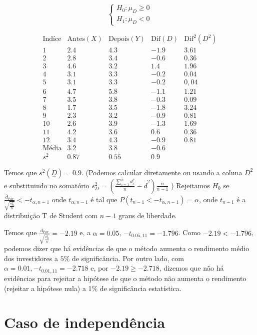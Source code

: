 \documentclass[
  letterpaper,
  DIV=11,
  numbers=noendperiod]{scrreprt}
\begin{document}
\[
\begin{cases}
H_{0}:\mu_{D} \geq 0 \\
H_{1}: \mu_{D} < 0
\end{cases}
\]

\[
\begin{array}{c|c|c|c}
\mathrm{Indíce}  & \mathrm{Antes}(X)  &  \mathrm{Depois}(Y) & \mathrm{Dif}(D) & \mathrm{Dif^2}(D^2)\\
\hline
1 & 2.4 &  4.3 & -1.9 & 3.61\\
2 & 2.8  & 3.4  & -0.6 & 0.36\\
3 & 4.6  & 3.2  & 1.4 & 1.96\\
4 & 3.1  & 3.3 & -0.2 & 0.04\\
5 & 3.1  & 3.3 & -0.2 & 0,04\\
6 & 4.7 &  5.8 & -1.1 & 1.21\\
7 & 3.5  & 3.8 & -0.3 & 0.09\\
8 & 1.7  & 3.5 & -1.8 & 3.24\\
9 & 2.3  & 3.2 & -0.9 & 0.81\\
10 & 2.6  & 3.9 & -1.3 & 1.69\\
11 & 4.2  & 3.6 & 0.6 & 0.36\\
12 & 3.4  & 4.3  & -0.9  & 0.81\\
\hline
\mathrm{Média}  & 3.2  & 3.8  & -0.6 \\
s^2 & 0.87  & 0.55  &  0.9
\end{array}
\]

Temos que \(s^2(\underset{\sim}{D})=0.9\). (Podemos calcular diretamente
ou usando a coluna \(D^2\) e substituindo no somatório
\(s^2_{D}=\left( \frac{\sum^n_{i=1}d_{i}^2}{n}-\bar{d}^2 \right) \frac{n}{n-1}\)
) Rejeitamos \(H_{0}\) se
\(\frac{\bar{d}_{\mathrm{Par}}}{\sqrt{ \frac{s^2_{D}}{n}}}<-t_{\alpha,n-1}\)
onde \(t_{\alpha,n-1}\) é tal que \(P(t_{n-1}<-t_{\alpha,n-1})=\alpha\),
onde \(t_{n-1}\) é a distribuição T de Student com \(n-1\) graus de
liberdade.

Temos que
\(\frac{\bar{d}_{\mathrm{Par}}}{\sqrt{ \frac{s^2_{D}}{n}}} =-2.19\) e, a
\(\alpha=0.05\), \(-t_{0.05,11}=-1.796\). Como \(-2.19< -1.796\),
podemos dizer que há evidências de que o método aumenta o rendimento
médio dos investidores a \(5\%\) de significância. Por outro lado, com
\(\alpha=0.01, -t_{0.01,11}=-2.718\) e, por \(-2.19\geq -2.718\),
dizemos que não há evidências para rejeitar a hipótese de que o método
não aumenta o rendimento (rejeitar a hipótese nula) a 1\% de
significância estatística.

\section{Caso de independência}\label{caso-de-independuxeancia}
\end{document}
